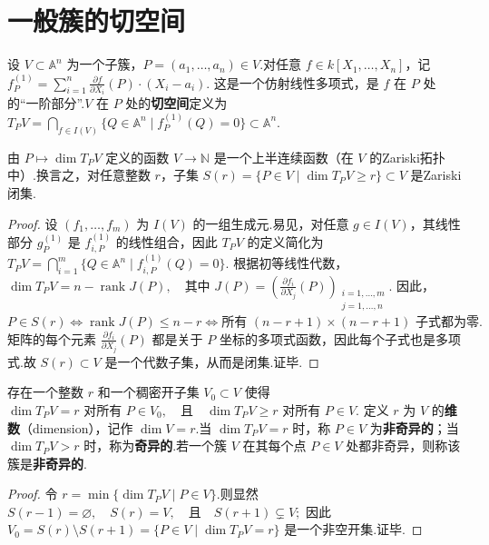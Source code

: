 \section{一般簇的切空间}

\begin{definition}
设 \(V \subset \mathbb{A}^n\) 为一个子簇，\(P = (a_1, \ldots, a_n) \in V\).对任意 \(f \in k[X_1, \ldots, X_n]\)，记
\(
f_P^{(1)} = \sum_{i=1}^n \frac{\partial f}{\partial X_i}(P) \cdot (X_i - a_i).
\)
这是一个仿射线性多项式，是 \(f\) 在 \(P\) 处的“一阶部分”.\(V\) 在 \(P\) 处的\textbf{切空间}定义为
\(
T_P V = \bigcap_{f \in I(V)} \{ Q \in \mathbb{A}^n \mid f_P^{(1)}(Q) = 0 \} \subset \mathbb{A}^n.
\)
\end{definition}

\begin{proposition}
由 \(P \mapsto \dim T_P V\) 定义的函数 \(V \to \mathbb{N}\) 是一个上半连续函数（在 \(V\) 的Zariski拓扑中）.换言之，对任意整数 \(r\)，子集
\(
S(r) = \{ P \in V \mid \dim T_P V \ge r \} \subset V
\)
是Zariski闭集.
\end{proposition}
\begin{proof}
设 \((f_1, \ldots, f_m)\) 为 \(I(V)\) 的一组生成元.易见，对任意 \(g \in I(V)\)，其线性部分 \(g_P^{(1)}\) 是 \(f_{i,P}^{(1)}\) 的线性组合，因此 \(T_P V\) 的定义简化为
\(
T_P V = \bigcap_{i=1}^m \{ Q \in \mathbb{A}^n \mid f_{i,P}^{(1)}(Q) = 0 \}.
\)
根据初等线性代数，
\(
\dim T_P V = n - \operatorname{rank} J(P), \quad \text{其中 } J(P) = \left( \frac{\partial f_i}{\partial X_j}(P) \right)_{\substack{i=1,\ldots,m \\ j=1,\ldots,n}}.
\)
因此，
\(
P \in S(r) \iff \operatorname{rank} J(P) \le n - r \iff \text{所有 } (n-r+1) \times (n-r+1) \text{ 子式都为零}.
\)
矩阵的每个元素 \(\frac{\partial f_i}{\partial X_j}(P)\) 都是关于 \(P\) 坐标的多项式函数，因此每个子式也是多项式.故 \(S(r) \subset V\) 是一个代数子集，从而是闭集.证毕.
\end{proof}

\begin{definition}
存在一个整数 \(r\) 和一个稠密开子集 \(V_0 \subset V\) 使得
\(
\dim T_P V = r \text{ 对所有 } P \in V_0, \quad \text{且} \quad \dim T_P V \ge r \text{ 对所有 } P \in V.
\)
定义 \(r\) 为 \(V\) 的\textbf{维数}（dimension），记作 \(\dim V = r\).当 \(\dim T_P V = r\) 时，称 \(P \in V\) 为\textbf{非奇异的}；当 \(\dim T_P V > r\) 时，称为\textbf{奇异的}.若一个簇 \(V\) 在其每个点 \(P \in V\) 处都非奇异，则称该簇是\textbf{非奇异的}.
\end{definition}
\begin{proof}
令 \(r = \min \{ \dim T_P V \mid P \in V \}\).则显然
\(
S(r-1) = \varnothing, \quad S(r) = V, \quad \text{且} \quad S(r+1) \subsetneq V;
\)
因此 \(V_0 = S(r) \setminus S(r+1) = \{ P \in V \mid \dim T_P V = r \}\) 是一个非空开集.证毕.
\end{proof}

